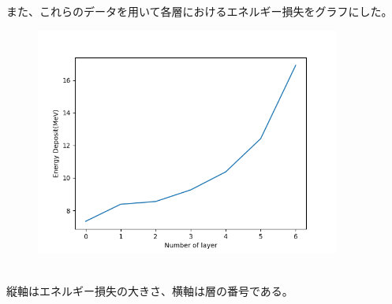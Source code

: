 \documentclass[a4paper]{jsarticle}
\begin{document}
また、これらのデータを用いて各層におけるエネルギー損失をグラフにした。
\begin{figure}[h]
\centering
\includegraphics[width=10cm]{dataPlot.png}
\end{figure}\\
縦軸はエネルギー損失の大きさ、横軸は層の番号である。
\end{document}
